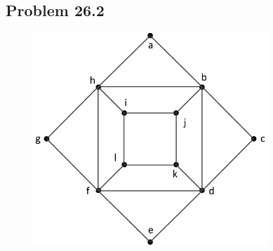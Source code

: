\documentclass[
        handout,
        ]{beamer}
\begin{document}
    \subsection{Problem 26.2}
        \begin{frame}[c]{\subsecname}
            \begin{figure}
                \centering
                \includegraphics[width=88mm]{tut11p23_2_1}
            \end{figure}
        \end{frame}
\end{document}
